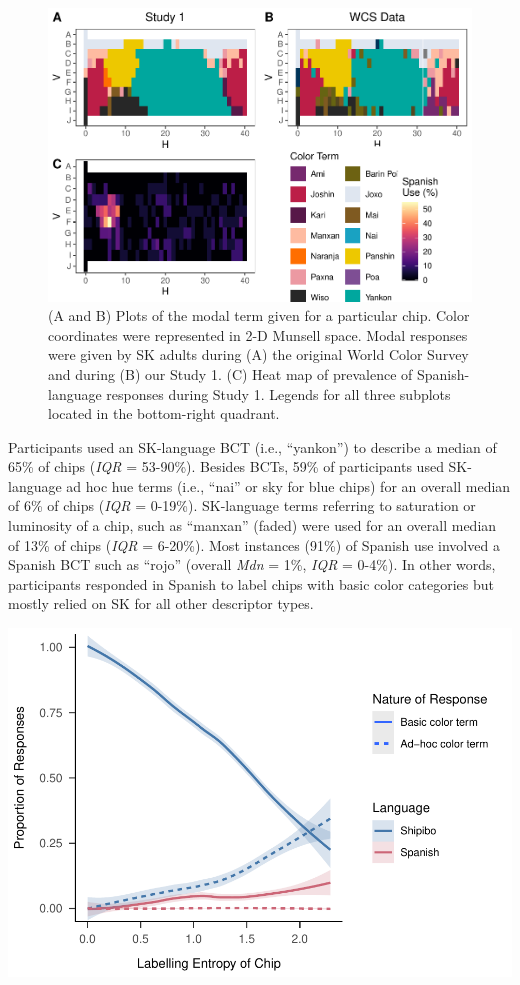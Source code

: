 \documentclass[
  english,
  ,man,floatsintext]{apa6}
\begin{document}
\begin{figure}
\centering
\includegraphics{amazon_color_files/figure-latex/study1-figure-1.pdf}
\caption{\label{fig:study1-figure}(A and B) Plots of the modal term given for a particular chip. Color coordinates were represented in 2-D Munsell space. Modal responses were given by SK adults during (A) the original World Color Survey and during (B) our Study 1. (C) Heat map of prevalence of Spanish-language responses during Study 1. Legends for all three subplots located in the bottom-right quadrant.}
\end{figure}

Participants used an SK-language BCT (i.e., \enquote{yankon}) to describe a median of 65\% of chips (\emph{IQR} = 53-90\%). Besides BCTs, 59\% of participants used SK-language ad hoc hue terms (i.e., \enquote{nai} or sky for blue chips) for an overall median of 6\% of chips (\emph{IQR} = 0-19\%). SK-language terms referring to saturation or luminosity of a chip, such as \enquote{manxan} (faded) were used for an overall median of 13\% of chips (\emph{IQR} = 6-20\%). Most instances (91\%) of Spanish use involved a Spanish BCT such as \enquote{rojo} (overall \emph{Mdn} = 1\%, \emph{IQR} = 0-4\%). In other words, participants responded in Spanish to label chips with basic color categories but mostly relied on SK for all other descriptor types.

\includegraphics{amazon_color_files/figure-latex/study1-corrected_entropy-1.pdf}
\end{document}
